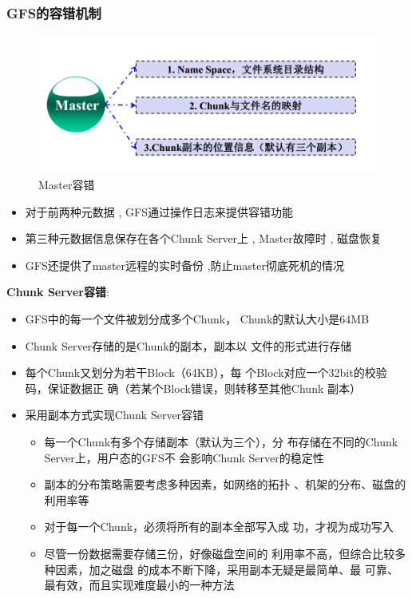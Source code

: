 \documentclass[UTF8,a4paper]{ctexart}
\begin{document}
\subsubsection{GFS的容错机制}
\begin{figure}[H]
  \centering
  \includegraphics[scale = 0.3]{assets/ParallelComputing_6e76e.png}
  \caption{Master容错}
\end{figure}

\begin{itemize}
  \item 对于前两种元数据 , GFS通过操作日志来提供容错功能
  \item 第三种元数据信息保存在各个Chunk Server上 , Master故障时 , 磁盘恢复
  \item GFS还提供了master远程的实时备份 ,防止master彻底死机的情况
\end{itemize}

\textbf{Chunk Server容错}:
\begin{itemize}
  \item GFS中的每一个文件被划分成多个Chunk，
Chunk的默认大小是64MB
  \item Chunk Server存储的是Chunk的副本，副本以
文件的形式进行存储
  \item 每个Chunk又划分为若干Block（64KB），每
个Block对应一个32bit的校验码，保证数据正
确（若某个Block错误，则转移至其他Chunk
副本）
\item 采用副本方式实现Chunk Server容错

\begin{itemize}
  \item 每一个Chunk有多个存储副本（默认为三个），分
  布存储在不同的Chunk Server上，用户态的GFS不
  会影响Chunk Server的稳定性
  \item 副本的分布策略需要考虑多种因素，如网络的拓扑
  、机架的分布、磁盘的利用率等
  \item 对于每一个Chunk，必须将所有的副本全部写入成
  功，才视为成功写入
  \item 尽管一份数据需要存储三份，好像磁盘空间的
  利用率不高，但综合比较多种因素，加之磁盘
  的成本不断下降，采用副本无疑是最简单、最
  可靠、最有效，而且实现难度最小的一种方法
\end{itemize}

\end{itemize}
\end{document}
